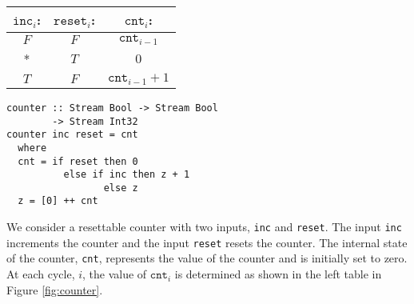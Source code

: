 \begin{figure*}
\begin{minipage}{0.4\linewidth}
\begin{tabular}{c|c||c}
$\mathtt{inc}_i$: & $\mathtt{reset}_i$: & $\mathtt{cnt}_i$: \\
\hline
$F$ & $F$ & $\mathtt{cnt}_{i-1}$ \\
\hline
* & $T$ & $0$ \\
\hline
$T$ & $F$ & $\mathtt{cnt}_{i-1} + 1$ \\
\hline
\end{tabular}
\end{minipage}
\hspace{1cm}
\begin{minipage}{0.6\linewidth}
\begin{lstlisting}[language = Copilot, frame = none]
counter :: Stream Bool -> Stream Bool
        -> Stream Int32
counter inc reset = cnt
  where
  cnt = if reset then 0
          else if inc then z + 1
                 else z
  z = [0] ++ cnt
\end{lstlisting}
\end{minipage}
\caption{A resettable counter. The specification is provided at the left and the
implementation is provided at the right.
}
\label{fig:counter}
\end{figure*}

\begin{example}
We consider a resettable counter with two inputs, {\tt inc} and {\tt reset}.
The input {\tt inc} increments the counter and the input {\tt reset} resets the
counter. The internal state of the counter, {\tt cnt}, represents the value of the
counter and is initially set to zero. At each cycle, $i$, the value of
$\mathtt{cnt}_i$ is determined as shown in the left table in Figure
\ref{fig:counter}.
\end{example}


